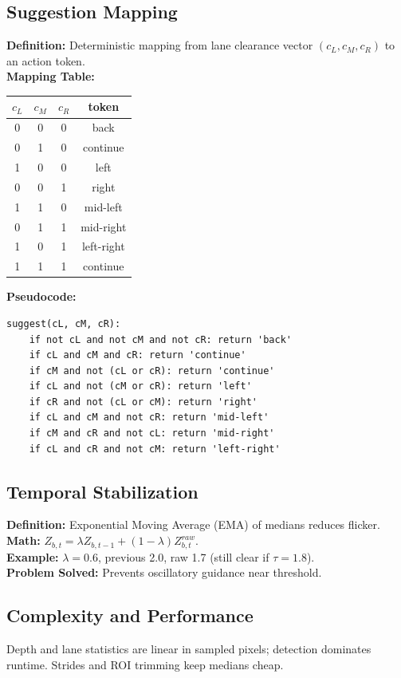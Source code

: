 \documentclass[11pt,a4paper]{article}
\begin{document}
\subsection{Suggestion Mapping}
\textbf{Definition:} Deterministic mapping from lane clearance vector $(c_L,c_M,c_R)$ to an action token.\\
\textbf{Mapping Table:}\begin{center}\begin{tabular}{ccc|c}\toprule$c_L$&$c_M$&$c_R$&token\\\midrule0&0&0&back\\0&1&0&continue\\1&0&0&left\\0&0&1&right\\1&1&0&mid-left\\0&1&1&mid-right\\1&0&1&left-right\\1&1&1&continue\\\bottomrule\end{tabular}\end{center}
\textbf{Pseudocode:}
\begin{lstlisting}[style=code]
suggest(cL, cM, cR):
    if not cL and not cM and not cR: return 'back'
    if cL and cM and cR: return 'continue'
    if cM and not (cL or cR): return 'continue'
    if cL and not (cM or cR): return 'left'
    if cR and not (cL or cM): return 'right'
    if cL and cM and not cR: return 'mid-left'
    if cM and cR and not cL: return 'mid-right'
    if cL and cR and not cM: return 'left-right'
\end{lstlisting}

\subsection{Temporal Stabilization}
\textbf{Definition:} Exponential Moving Average (EMA) of medians reduces flicker.\\
\textbf{Math:} $Z_{b,t}=\lambda Z_{b,t-1} + (1-\lambda) Z_{b,t}^{raw}$.\\
\textbf{Example:} $\lambda=0.6$, previous 2.0, raw 1.7  (still clear if $\tau=1.8$).\\
\textbf{Problem Solved:} Prevents oscillatory guidance near threshold.

\subsection{Complexity and Performance}
Depth and lane statistics are linear in sampled pixels; detection dominates runtime. Strides and ROI trimming keep medians cheap.
\end{document}
